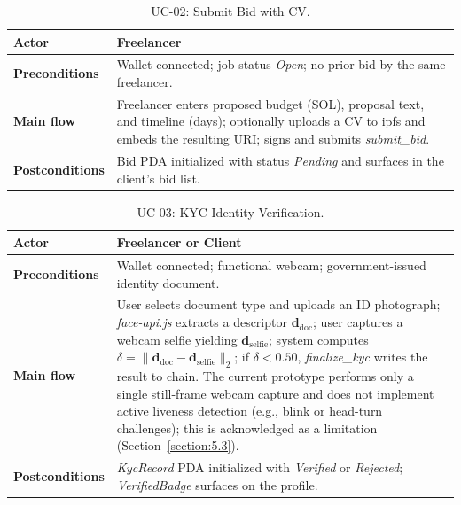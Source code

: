 \begin{table}[H]
\centering
\caption{UC-02: Submit Bid with CV.}
\label{table:uc02}
\small
\begin{tabular}{|l|p{9.5cm}|}
\hline
\textbf{Actor} & Freelancer \\ \hline
\textbf{Preconditions} & Wallet connected; job status \emph{Open}; no prior bid by the same freelancer. \\ \hline
\textbf{Main flow} & Freelancer enters proposed budget (SOL), proposal text, and timeline (days); optionally uploads a CV to \gls{ipfs} and embeds the resulting URI; signs and submits \emph{submit\_bid}. \\ \hline
\textbf{Postconditions} & Bid PDA initialized with status \emph{Pending} and surfaces in the client's bid list. \\ \hline
\end{tabular}
\end{table}

\begin{table}[H]
\centering
\caption{UC-03: KYC Identity Verification.}
\label{table:uc03}
\small
\begin{tabular}{|l|p{9.5cm}|}
\hline
\textbf{Actor} & Freelancer or Client \\ \hline
\textbf{Preconditions} & Wallet connected; functional webcam; government-issued identity document. \\ \hline
\textbf{Main flow} & User selects document type and uploads an ID photograph; \emph{face-api.js} extracts a descriptor $\mathbf{d}_{\text{doc}}$; user captures a webcam selfie yielding $\mathbf{d}_{\text{selfie}}$; system computes $\delta = \|\mathbf{d}_{\text{doc}} - \mathbf{d}_{\text{selfie}}\|_2$; if $\delta < 0.50$, \emph{finalize\_kyc} writes the result to chain. The current prototype performs only a single still-frame webcam capture and does not implement active liveness detection (e.g., blink or head-turn challenges); this is acknowledged as a limitation (Section~\ref{section:5.3}). \\ \hline
\textbf{Postconditions} & \emph{KycRecord} PDA initialized with \emph{Verified} or \emph{Rejected}; \emph{VerifiedBadge} surfaces on the profile. \\ \hline
\end{tabular}
\end{table}

